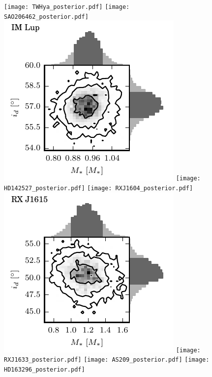 \documentclass{aastex6}
\begin{document}
\begin{figure}[htb]
\begin{center}
\texttt{[image: TWHya\_posterior.pdf]}
\texttt{[image: SAO206462\_posterior.pdf]}
\includegraphics{IMLup_posterior.pdf}
\texttt{[image: HD142527\_posterior.pdf]}
\texttt{[image: RXJ1604\_posterior.pdf]}
\includegraphics{RXJ1615_posterior.pdf}
\texttt{[image: RXJ1633\_posterior.pdf]}
\texttt{[image: AS209\_posterior.pdf]}
\texttt{[image: HD163296\_posterior.pdf]}
\end{center}
\end{figure}
\end{document}
